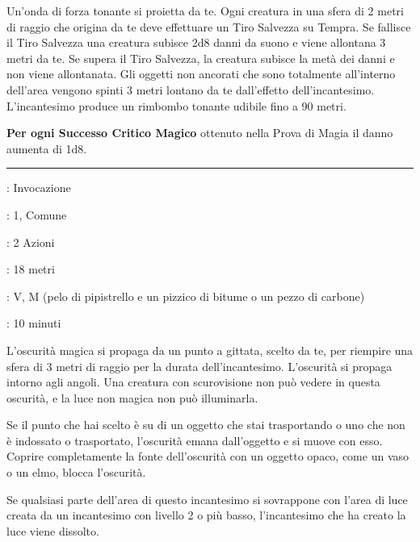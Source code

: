 \begin{multicols}{2}
Un'onda di forza tonante si proietta da te. Ogni creatura in una sfera di 2 metri di raggio che origina da te deve effettuare un Tiro Salvezza su Tempra. Se fallisce il Tiro Salvezza una creatura subisce 2d8 danni da suono e viene allontana 3 metri da te. Se supera il Tiro Salvezza, la creatura subisce la metà dei danni e non viene allontanata. Gli oggetti non ancorati che sono totalmente all'interno dell'area vengono spinti 3 metri lontano da te dall'effetto dell'incantesimo. L'incantesimo produce un rimbombo tonante udibile fino a 90 metri.

\textbf{Per ogni Successo Critico Magico} ottenuto nella Prova di Magia il danno aumenta di 1d8.

\smallskip\noindent\rule{\linewidth}{2pt} \hypertarget{Oscurità}{}\smallskip{}
\noindent
\begin{description}[noitemsep, topsep=0pt, parsep=0pt, partopsep=0pt, leftmargin=0cm, labelwidth=2.8cm]
	\item[\textbf{Lista di Magia}]: Invocazione
	\item[\textbf{Livello}]: 1, Comune
	\item[\textbf{T. di Lancio}]: 2 Azioni
	\item[\textbf{Gittata}]: 18 metri
	\item[\textbf{Componenti}]: V, M (pelo di pipistrello e un pizzico di bitume o un pezzo di carbone)
	\item[\textbf{Durata}]: 10 minuti
\end{description}

L'oscurità magica si propaga da un punto a gittata, scelto da te, per riempire una sfera di 3 metri di raggio per la durata dell'incantesimo. L'oscurità si propaga intorno agli angoli. Una creatura con scurovisione non può vedere in questa oscurità, e la luce non magica non può illuminarla.

Se il punto che hai scelto è su di un oggetto che stai trasportando o uno che non è indossato o trasportato, l'oscurità emana dall'oggetto e si muove con esso. Coprire completamente la fonte dell'oscurità con un oggetto opaco, come un vaso o un elmo, blocca l'oscurità.

Se qualsiasi parte dell'area di questo incantesimo si sovrappone con l'area di luce creata da un incantesimo con livello 2 o più basso, l'incantesimo che ha creato la luce viene dissolto.


\end{multicols}
